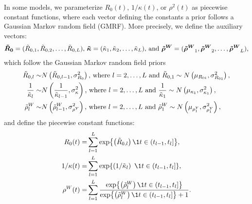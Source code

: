 In some models, we parameterize \( R_0(t) \), \( 1 / \kappa(t) \), or \( \rho^2(t) \) as piecewise constant functions, where each vector defining the constants a prior follows a Gaussian Markov random field (GMRF).
More precisely, we define the auxiliary vectors:
\begin{gather*}
\boldsymbol{\tilde{R}_0} = (\tilde{R}_{0,1}, \tilde{R}_{0,2}, \ldots, \tilde{R}_{0,L}) \text{, }
\boldsymbol{\tilde{\kappa}} = (\tilde{\kappa}_1, \tilde{\kappa}_2, \ldots, \tilde{\kappa}_L)  \text{, and }
\boldsymbol{\tilde{\rho}^W} = (\boldsymbol{\tilde{\rho}^W}_1, \boldsymbol{\tilde{\rho}^W}_2, \ldots, \boldsymbol{\tilde{\rho}^W}_L),
\end{gather*}
which follow the Gaussian Markov random field priors
\begin{equation}
\begin{aligned}
	\tilde{R}_{0,l} \sim& N\left(\tilde{R}_{0, l - 1}, \sigma_{R_0}^2\right)\text{, where } l=2,\ldots,L \text{ and } \tilde{R}_{0,1} \sim N\left(\mu_{R_{01}},\sigma^2_{R_{01}}\right),\\
	\frac{1}{\tilde{\kappa}_{l}} \sim& N\left(\frac{1}{\tilde{\kappa}_{l - 1}}, \sigma_\kappa^2\right)\text{, where } l=2,\ldots,L \text{ and } \frac{1}{\tilde{\kappa}_1} \sim N\left(\mu_{\kappa_1},\sigma^2_{\kappa_1}\right),\\
	\tilde{\rho}^W_{l} \sim& N\left(\tilde{\rho}^W_{l - 1}, \sigma_{\rho^Y}^2\right)\text{, where } l=2,\ldots,L \text{ and } \tilde{\rho}^W_1 \sim N\left(\mu_{\rho^Y_1}, \sigma^2_{\rho^Y_1}\right),
 \label{ch_5:eqn:GMRF}
\end{aligned}
\end{equation}
and define the piecewise constant functions:
\begin{align}
	R_0(t) =& \sum_{l=1}^L \exp{\left( \tilde{R}_{0,l} \right) \1{t \in (t_{l-1}, t_l]}},\\
	1 / \kappa(t) =& \sum_{l=1}^L \exp{\left( 1 / \kappatilde_l \right)\ \1{t \in (t_{l-1}, t_l]} },\\
	\rho^W(t) =& \sum_{l=1}^L \frac{\exp{\left( \rhowtilde_l \right) \1{t \in (t_{l-1}, t_l]} }}{\exp{\left( \rhowtilde_l \right) \1{t \in (t_{l-1}, t_l]} } + 1}.
\end{align}

